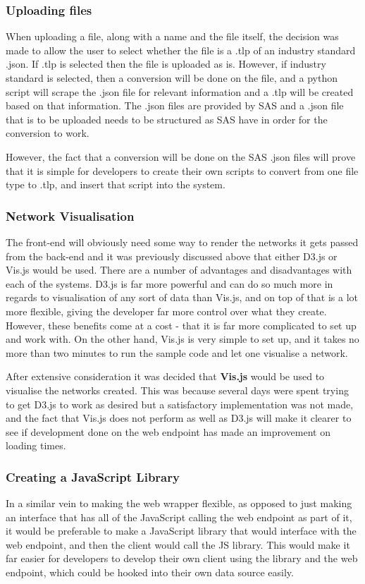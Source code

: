 \documentclass[../dissertation.tex]{subfiles}
\begin{document}
\subsubsection{Uploading files}

When uploading a file, along with a name and the file itself, the decision was made to allow the user to select whether the file is a .tlp of an industry standard .json. If .tlp is selected then the file is uploaded as is. However, if industry standard is selected, then a conversion will be done on the file, and a python script will scrape the .json file for relevant information and a .tlp will be created based on that information. The .json files are provided by SAS and a .json file that is to be uploaded needs to be structured as SAS have in order for the conversion to work. 

However, the fact that a conversion will be done on the SAS .json files will prove that it is simple for developers to create their own scripts to convert from one file type to .tlp, and insert that script into the system.

\subsubsection{Network Visualisation}

The front-end will obviously need some way to render the networks it gets passed from the back-end and it was previously discussed above that either D3.js or Vis.js would be used. There are a number of advantages and disadvantages with each of the systems. D3.js is far more powerful and can do so much more in regards to visualisation of any sort of data than Vis.js, and on top of that is a lot more flexible, giving the developer far more control over what they create. However, these benefits come at a cost - that it is far more complicated to set up and work with. On the other hand, Vis.js is very simple to set up, and it takes no more than two minutes to run the sample code and let one visualise a network. 

After extensive consideration it was decided that \textbf{Vis.js} would be used to visualise the networks created. This was because several days were spent trying to get D3.js to work as desired but a satisfactory implementation was not made, and the fact that Vis.js does not perform as well as D3.js will make it clearer to see if development done on the web endpoint has made an improvement on loading times.

\subsubsection{Creating a JavaScript Library}
In a similar vein to making the web wrapper flexible, as opposed to just making an interface that has all of the JavaScript calling the web endpoint as part of it, it would be preferable to make a JavaScript library that would interface with the web endpoint, and then the client would call the JS library. This would make it far easier for developers to develop their own client using the library and the web endpoint, which could be hooked into their own data source easily.
\end{document}
